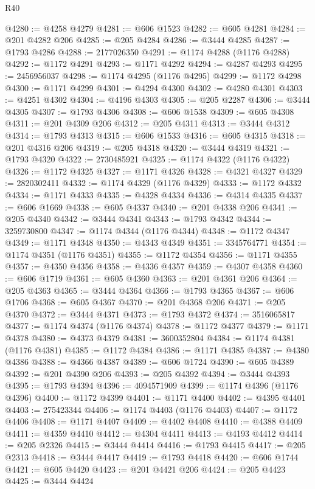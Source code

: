 \begin{lexlean}{R40}
\begin{coremodule}
@4280 := @4258 @4279
@4281 := @606 @1523
@4282 := @605 @4281
@4284 := @201 @4282 @206
@4285 := @205 @4284
@4286 := @3444 @4285
@4287 := @1793 @4286
@4288 := 2177026350
@4291 := @1174 @4288 (@1176 @4288)
@4292 := @1172 @4291
@4293 := @1171 @4292
@4294 := @4287 @4293
@4295 := 2456956037
@4298 := @1174 @4295 (@1176 @4295)
@4299 := @1172 @4298
@4300 := @1171 @4299
@4301 := @4294 @4300
@4302 := @4280 @4301
@4303 := @4251 @4302
@4304 := @4196 @4303
@4305 := @205 @2287
@4306 := @3444 @4305
@4307 := @1793 @4306
@4308 := @606 @1538
@4309 := @605 @4308
@4311 := @201 @4309 @206
@4312 := @205 @4311
@4313 := @3444 @4312
@4314 := @1793 @4313
@4315 := @606 @1533
@4316 := @605 @4315
@4318 := @201 @4316 @206
@4319 := @205 @4318
@4320 := @3444 @4319
@4321 := @1793 @4320
@4322 := 2730485921
@4325 := @1174 @4322 (@1176 @4322)
@4326 := @1172 @4325
@4327 := @1171 @4326
@4328 := @4321 @4327
@4329 := 2820302411
@4332 := @1174 @4329 (@1176 @4329)
@4333 := @1172 @4332
@4334 := @1171 @4333
@4335 := @4328 @4334
@4336 := @4314 @4335
@4337 := @606 @1669
@4338 := @605 @4337
@4340 := @201 @4338 @206
@4341 := @205 @4340
@4342 := @3444 @4341
@4343 := @1793 @4342
@4344 := 3259730800
@4347 := @1174 @4344 (@1176 @4344)
@4348 := @1172 @4347
@4349 := @1171 @4348
@4350 := @4343 @4349
@4351 := 3345764771
@4354 := @1174 @4351 (@1176 @4351)
@4355 := @1172 @4354
@4356 := @1171 @4355
@4357 := @4350 @4356
@4358 := @4336 @4357
@4359 := @4307 @4358
@4360 := @606 @1719
@4361 := @605 @4360
@4363 := @201 @4361 @206
@4364 := @205 @4363
@4365 := @3444 @4364
@4366 := @1793 @4365
@4367 := @606 @1706
@4368 := @605 @4367
@4370 := @201 @4368 @206
@4371 := @205 @4370
@4372 := @3444 @4371
@4373 := @1793 @4372
@4374 := 3516065817
@4377 := @1174 @4374 (@1176 @4374)
@4378 := @1172 @4377
@4379 := @1171 @4378
@4380 := @4373 @4379
@4381 := 3600352804
@4384 := @1174 @4381 (@1176 @4381)
@4385 := @1172 @4384
@4386 := @1171 @4385
@4387 := @4380 @4386
@4388 := @4366 @4387
@4389 := @606 @1724
@4390 := @605 @4389
@4392 := @201 @4390 @206
@4393 := @205 @4392
@4394 := @3444 @4393
@4395 := @1793 @4394
@4396 := 4094571909
@4399 := @1174 @4396 (@1176 @4396)
@4400 := @1172 @4399
@4401 := @1171 @4400
@4402 := @4395 @4401
@4403 := 275423344
@4406 := @1174 @4403 (@1176 @4403)
@4407 := @1172 @4406
@4408 := @1171 @4407
@4409 := @4402 @4408
@4410 := @4388 @4409
@4411 := @4359 @4410
@4412 := @4304 @4411
@4413 := @4193 @4412
@4414 := @205 @2326
@4415 := @3444 @4414
@4416 := @1793 @4415
@4417 := @205 @2313
@4418 := @3444 @4417
@4419 := @1793 @4418
@4420 := @606 @1744
@4421 := @605 @4420
@4423 := @201 @4421 @206
@4424 := @205 @4423
@4425 := @3444 @4424

\end{coremodule}
\end{lexlean}
